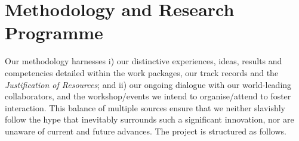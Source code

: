 \documentclass[a4paper,11pt]{article}
\begin{document}



\vspace*{-0.2in}

\section{Methodology and Research Programme}
\vspace*{-0.1in}

Our methodology harnesses i) our distinctive
experiences, ideas, results and
competencies detailed within the work packages, our track records and the {\em
  Justification of Resources}; and 
ii) our ongoing dialogue with our
world-leading collaborators, and the workshop/events we intend to
organise/attend to foster interaction. This balance of multiple sources ensure that we neither
slavishly follow the hype that inevitably surrounds such a significant
innovation, nor are unaware of current and future advances. The
project is structured as follows.


\end{document}

